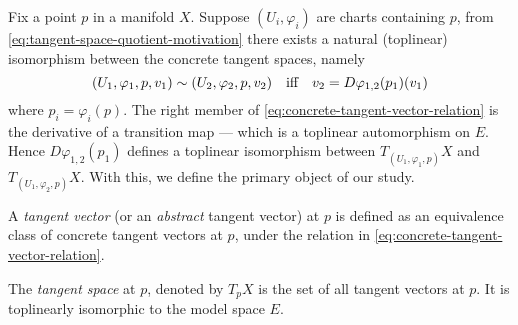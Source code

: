 \documentclass[../main-manifolds.tex]{subfiles}
\begin{document}
Fix a point $p$ in a manifold $X$. Suppose $(U_i,\varphi_i)$ are charts containing $p$, from \cref{eq:tangent-space-quotient-motivation} there exists a natural (toplinear) isomorphism between the concrete tangent spaces, namely 
\begin{equation}\label{eq:concrete-tangent-vector-relation}
    (U_1,\varphi_1,p,v_1)\sim (U_2,\varphi_2,p,v_2)\qqtext{iff} v_2 = D\varphi_{1,2}(p_1)(v_1)
\end{equation}
where $p_i = \varphi_i (p)$. The right member of \cref{eq:concrete-tangent-vector-relation}  is the derivative of a transition map --- which is a toplinear automorphism on $E$. Hence $D\varphi_{1,2}(p_1)$ defines a toplinear isomorphism between $T_{(U_1,\varphi_1,p)}X$ and $T_{(U_1,\varphi_2,p)}X$. With this, we define the primary object of our study.
\begin{definition}\label{def:tangent-vector}
    A \emph{tangent vector} (or an \emph{abstract} tangent vector) at $p$ is defined as an equivalence class of concrete tangent vectors at $p$, under the relation in \cref{eq:concrete-tangent-vector-relation}.
\end{definition}

\begin{definition}\label{def:tangent-space}
    The \emph{tangent space} at $p$, denoted by $T_p X$ is the set of all tangent vectors at $p$. It is toplinearly isomorphic to the model space $E$.
\end{definition}
\end{document}
